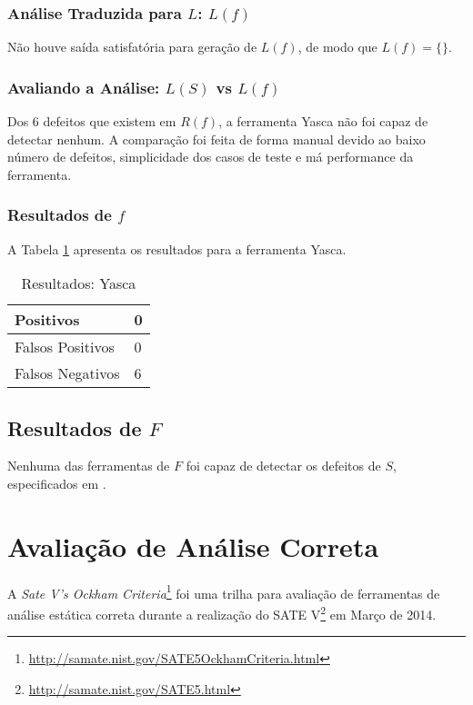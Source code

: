\subsubsection{Análise Traduzida para $L$: $L(f)$}

Não houve saída satisfatória para geração de $L(f)$, de modo que 
$L(f) = \lbrace\rbrace$.

\subsubsection{Avaliando a Análise: $L(S)$ vs $L(f)$}

Dos 6 defeitos que existem em $R(f)$, a ferramenta Yasca não foi capaz de detectar nenhum. A comparação foi feita de forma manual devido ao baixo número de defeitos, simplicidade dos casos de teste e má performance da ferramenta.

\subsubsection{Resultados de $f$}

A Tabela \ref{tabela_yasca} apresenta os resultados para a ferramenta Yasca.
\begin{table}[h]
\caption{Resultados: Yasca}
  \centering
\begin{tabular}{l | l}
  \hline
  Positivos\index{positivo} & 0 \\ \hline
  Falsos Positivos\index{falso positivo} & 0 \\ \hline
  Falsos Negativos\index{falso negativo} & 6 \\
  \hline
\end{tabular}
\label{tabela_yasca}
\end{table}

\subsection{Resultados de $F$}

Nenhuma das ferramentas de $F$ foi capaz de detectar os defeitos de $S$, especificados em .

\section{Avaliação de Análise Correta}

A \textit{Sate V's Ockham Criteria}\footnote{\url{http://samate.nist.gov/SATE5OckhamCriteria.html}} foi uma trilha para avaliação de ferramentas de análise estática correta durante a realização do SATE V\footnote{\url{http://samate.nist.gov/SATE5.html}} em Março de 2014.


